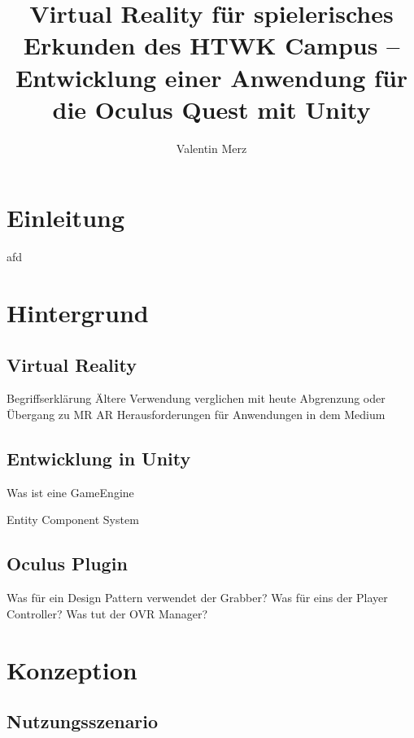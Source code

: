\documentclass[11pt]{article} %
\title{Virtual Reality für spielerisches Erkunden des HTWK Campus – Entwicklung einer Anwendung für die Oculus Quest mit Unity}
\author{Valentin Merz}
\begin{document}
\maketitle

\clearpage


\tableofcontents

\clearpage



\section{Einleitung}

afd




\section{Hintergrund}

\subsection{Virtual Reality}

Begriffserklärung
Ältere Verwendung verglichen mit heute
Abgrenzung oder Übergang zu MR AR
Herausforderungen für Anwendungen in dem Medium

\subsection{Entwicklung in Unity}

Was ist eine GameEngine

Entity Component System

\subsection{Oculus Plugin}

Was für ein Design Pattern verwendet der Grabber?
Was für eins der Player Controller?
Was tut der OVR Manager?



\section{Konzeption}


\subsection{Nutzungsszenario} %
\end{document}
